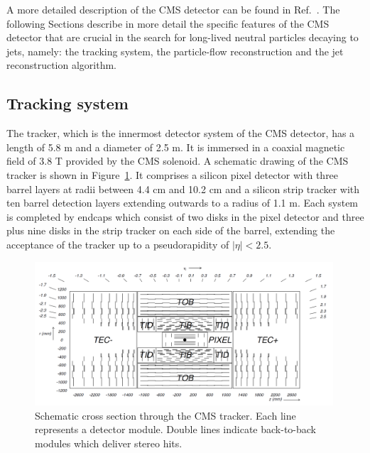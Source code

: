A more detailed description of the CMS detector can be found in Ref.~\cite{Chatrchyan:2008zzk}.  
The following Sections describe in more detail the specific features of the CMS detector
that are crucial in the search for long-lived neutral particles decaying to jets, namely: the
tracking system, the particle-flow reconstruction and the jet reconstruction algorithm.

\subsection{Tracking system}
\label{subsec:trackreco}

The tracker, which is the innermost detector system of the CMS detector, has a length
of 5.8 m and a
diameter of 2.5 m. It is immersed in a coaxial magnetic field of 3.8 T
provided by the CMS solenoid. A schematic drawing of the CMS tracker is shown in
Figure~\ref{fig:tracker}. It comprises a silicon pixel detector with three barrel layers at radii
between 4.4 cm and 10.2 cm and a silicon strip tracker with ten barrel
detection layers extending outwards to a radius of 1.1 m. Each system is
completed by endcaps which consist of two disks in the pixel detector and three
plus nine disks in the strip tracker on each side of the barrel, extending
the acceptance of the tracker up to a pseudorapidity of $|\eta| < 2.5$.
\begin{figure}[!h]
\centering
\includegraphics[width=0.99\textwidth]{plots/intro/tracker.png}
\caption{Schematic cross section through the CMS tracker. Each line represents a
detector module. Double lines indicate back-to-back modules which deliver stereo
hits.\label{fig:tracker}}
\end{figure}

